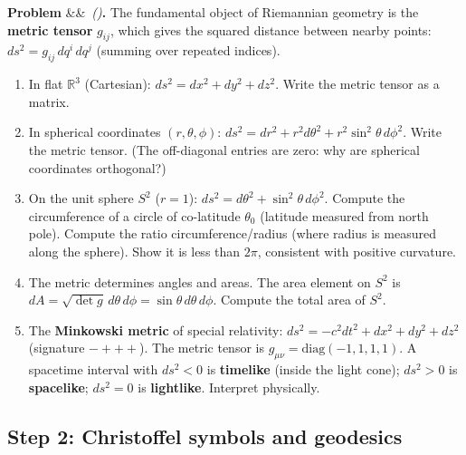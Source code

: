 \documentclass[12pt,a4paper]{article}
\newcounter{problem}
\newenvironment{problem}[1][]{\refstepcounter{problem}\par\vspace{6pt}\noindent\textbf{\color{MidBlue}Problem \theproblem}\ifx&#1&\else\ \textit{(#1)}\fi\textbf{.}\enskip}{\par\vspace{4pt}}
\begin{document}
\begin{problem}
\label{prob:metric}
The fundamental object of Riemannian geometry is the \textbf{metric tensor} $g_{ij}$, which gives the squared distance between nearby points:
$ds^2 = g_{ij}\,dq^i\,dq^j$ (summing over repeated indices).
\begin{enumerate}[label=(\alph*),topsep=2pt]
  \item In flat $\mathbb{R}^3$ (Cartesian): $ds^2=dx^2+dy^2+dz^2$. Write the metric tensor as a matrix.
  \item In spherical coordinates $(r,\theta,\phi)$: $ds^2=dr^2+r^2d\theta^2+r^2\sin^2\!\theta\,d\phi^2$. Write the metric tensor. (The off-diagonal entries are zero: why are spherical coordinates orthogonal?)
  \item On the unit sphere $S^2$ ($r=1$): $ds^2=d\theta^2+\sin^2\!\theta\,d\phi^2$. Compute the circumference of a circle of co-latitude $\theta_0$ (latitude measured from north pole). Compute the ratio circumference/radius (where radius is measured along the sphere). Show it is less than $2\pi$, consistent with positive curvature.
  \item The metric determines angles and areas. The area element on $S^2$ is $dA = \sqrt{\det g}\,d\theta\,d\phi = \sin\theta\,d\theta\,d\phi$. Compute the total area of $S^2$.
  \item The \textbf{Minkowski metric} of special relativity: $ds^2 = -c^2dt^2+dx^2+dy^2+dz^2$ (signature $-+++$). The metric tensor is $g_{\mu\nu}=\text{diag}(-1,1,1,1)$. A spacetime interval with $ds^2<0$ is \textbf{timelike} (inside the light cone); $ds^2>0$ is \textbf{spacelike}; $ds^2=0$ is \textbf{lightlike}. Interpret physically.
\end{enumerate}
\end{problem}

\subsection{Step 2: Christoffel symbols and geodesics}
\end{document}
